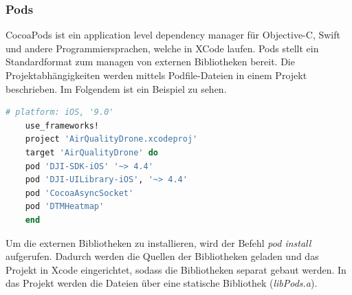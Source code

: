\subsubsection{Pods}
CocoaPods ist ein application level dependency manager für Objective-C, Swift und andere Programmiersprachen, welche in XCode laufen. Pods stellt ein Standardformat zum managen von externen Bibliotheken bereit.
\newline
Die Projektabhängigkeiten werden mittels Podfile-Dateien in einem Projekt beschrieben. Im Folgendem ist ein Beispiel zu sehen.
\newline
\begin{lstlisting}[language=ruby, caption={Podfile Beispiel}]
	# platform: iOS, '9.0'
	use_frameworks!
	project 'AirQualityDrone.xcodeproj'
	target 'AirQualityDrone' do
	pod 'DJI-SDK-iOS' '~> 4.4'
	pod 'DJI-UILibrary-iOS', '~> 4.4'
	pod 'CocoaAsyncSocket'
	pod 'DTMHeatmap'
	end
\end{lstlisting}
Um die externen Bibliotheken zu installieren, wird der Befehl \textit{pod install} aufgerufen. Dadurch werden die Quellen der Bibliotheken geladen und das Projekt in Xcode eingerichtet, sodass die Bibliotheken separat gebaut werden. In das Projekt werden die Dateien über eine statische Bibliothek (\textit{libPods.a}). \cite{CocoaPods} \cite{Cocoa.Wikibooks}

